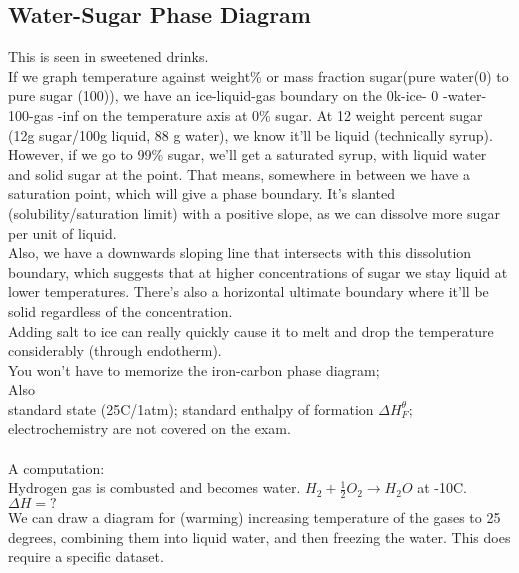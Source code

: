 \documentclass[10pt, twocolumn]{report}
\begin{document}
    \subsection{Water-Sugar Phase Diagram}
    This is seen in sweetened drinks. \\ If we graph temperature against weight\% or mass fraction sugar(pure water(0) to pure sugar (100)), we have an ice-liquid-gas boundary on the  0k-ice- 0 -water- 100-gas -inf on the temperature axis at 0\% sugar. At 12 weight percent sugar (12g sugar/100g liquid, 88 g water), we know it'll be liquid (technically syrup). However, if we go to 99\% sugar, we'll get a saturated syrup, with liquid water and solid sugar at the point. That means, somewhere in between we have a saturation point, which will give a phase boundary. It's slanted (solubility/saturation limit) with a positive slope, as we can dissolve more sugar per unit of liquid. \\ Also, we have a downwards sloping line that intersects with this dissolution boundary, which suggests that at higher concentrations of sugar we stay liquid at lower temperatures. There's also a horizontal ultimate boundary where it'll be solid regardless of the concentration. \\Adding salt to ice can really quickly cause it to melt and drop the temperature considerably (through endotherm). \\

    You won't have to memorize the iron-carbon phase diagram; \\ Also \\
    standard state (25C/1atm); standard enthalpy of formation $\Delta H^\theta_F$; electrochemistry are not covered on the exam.\\\\
    A computation:\\
    Hydrogen gas is combusted and becomes water.
    $H_2 + \frac{1}{2} O_2 \rightarrow H_2O$ at -10C. $\Delta H = ?$ \\
    We can draw a diagram for (warming) increasing temperature of the gases to 25 degrees, combining them into liquid water, and then freezing the water. This does require a specific dataset. 

\end{document}
